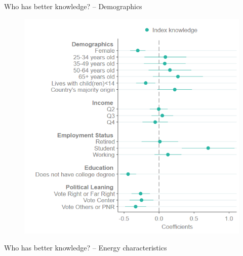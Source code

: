 \begin{framefont}{\small}
\begin{frame}{Who has better knowledge? -- Demographics}
\begin{figure}
	\includegraphics[width=.5\paperwidth]{../figures/FR/Coefplot_SetA_PlotA_index_knowledge.png}
\end{figure}
\end{frame}

\begin{frame}{Who has better knowledge? -- Energy characteristics}


\end{frame}
\end{framefont}
